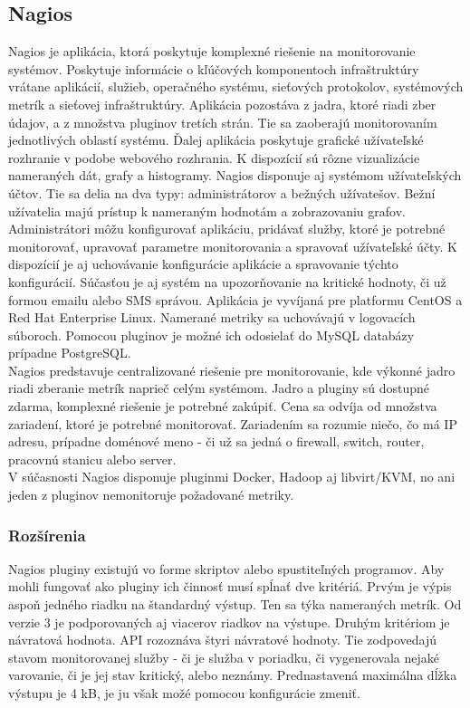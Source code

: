 \documentclass[printed,11pt,twoside,color,cover,table]{fithesis3}
\begin{document}
\subsection{Nagios}
Nagios je aplikácia, ktorá poskytuje komplexné riešenie na monitorovanie systémov. Poskytuje informácie o kľúčových komponentoch infraštruktúry vrátane aplikácií, služieb, operačného systému, sieťových protokolov, systémových metrík
a sieťovej infraštruktúry. \cite{nagios} 
Aplikácia pozostáva z jadra, ktoré riadi zber údajov, a z množstva pluginov tretích strán. Tie sa zaoberajú monitorovaním jednotlivých oblastí systému. Ďalej aplikácia
poskytuje grafické užívateľské rozhranie v podobe webového rozhrania. K dispozícií sú rôzne vizualizácie nameraných dát, grafy a histogramy. Nagios disponuje aj systémom užívateľských účtov. Tie sa delia na dva typy: 
administrátorov a bežných užívatešov. Bežní užívatelia majú prístup k nameraným hodnotám a zobrazovaniu grafov. Administrátori môžu konfigurovať aplikáciu, pridávať služby, ktoré je potrebné monitorovať,
upravovať parametre monitorovania a spravovať užívateľské účty. K dispozícií je aj uchovávanie konfigurácie aplikácie a spravovanie týchto konfigurácií. Súčasťou je aj systém na upozorňovanie na kritické
hodnoty, či už formou emailu alebo SMS správou. Aplikácia je vyvíjaná pre platformu CentOS a Red Hat Enterprise Linux. Namerané metriky sa uchovávajú v logovacích súboroch. 
Pomocou pluginov je možné ich odosielať do MySQL databázy prípadne PostgreSQL. 
\\Nagios predstavuje centralizované riešenie pre  monitorovanie, kde výkonné jadro riadi zberanie metrík naprieč celým systémom. 
Jadro a pluginy sú dostupné zdarma, komplexné riešenie je potrebné zakúpiť. Cena sa odvíja od množstva zariadení, ktoré je potrebné monitorovať. Zariadením sa rozumie niečo, čo má IP adresu, 
prípadne doménové meno - či už sa jedná o firewall, switch, router, pracovnú stanicu alebo server. 
\\V súčasnosti Nagios disponuje pluginmi Docker, Hadoop aj libvirt/KVM, no ani jeden z pluginov nemonitoruje požadované metriky.

\subsubsection{Rozšírenia}
Nagios pluginy existujú vo forme skriptov alebo spustiteľných programov. Aby mohli fungovať ako pluginy ich činnosť musí spĺnať dve kritériá. Prvým je výpis aspoň jedného riadku na štandardný výstup.
Ten sa týka nameraných metrík. Od verzie 3 je podporovaných aj viacerov riadkov na výstupe. Druhým kritériom je návratová hodnota.
API rozoznáva štyri návratové hodnoty. Tie zodpovedajú stavom monitorovanej služby - či je služba v poriadku, či vygenerovala nejaké varovanie, či je jej stav kritický, alebo neznámy. Prednastavená maximálna dĺžka 
výstupu je 4 kB, je ju však možé pomocou konfigurácie zmeniť.
\end{document}
